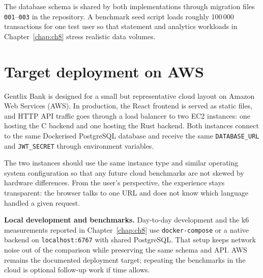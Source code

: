 \par The database schema is shared by both implementations through migration 
files \texttt{001}--\texttt{003} in the repository. A benchmark seed script 
loads roughly 100\,000 transactions for one test user so that statement and 
analytics workloads in Chapter~\ref{chap:ch8} stress realistic data volumes.

\section{Target deployment on AWS}
\label{sec:ch2sec4}

\par Gentlix Bank is designed for a small but representative cloud layout on 
Amazon Web Services (AWS). In production, the React frontend is served as static 
files, and HTTP API traffic goes through a load balancer to two EC2 instances: 
one hosting the C backend and one hosting the Rust backend. Both instances 
connect to the same Dockerised PostgreSQL database and receive the same 
\texttt{DATABASE\_URL} and \texttt{JWT\_SECRET} through environment variables.

\par The two instances should use the same instance type and similar operating 
system configuration so that any future cloud benchmarks are not skewed by 
hardware differences. From the user's perspective, the experience stays 
transparent: the browser talks to one URL and does not know which language 
handled a given request.

\par \textbf{Local development and benchmarks.} Day-to-day development and the 
k6 measurements reported in Chapter~\ref{chap:ch8} use \texttt{docker-compose} 
or a native backend on \texttt{localhost:6767} with shared PostgreSQL. That setup 
keeps network noise out of the comparison while preserving the same schema and 
API. AWS remains the documented deployment target; repeating the benchmarks in 
the cloud is optional follow-up work if time allows.
